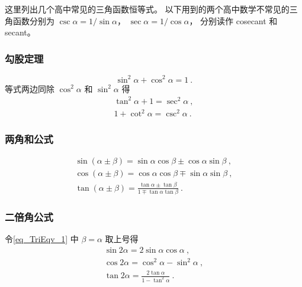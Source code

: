

这里列出几个高中常见的三角函数恒等式。 以下用到的两个高中数学不常见的三角函数分别为 $\csc \alpha= 1/\sin \alpha$， $\sec \alpha = 1/\cos \alpha$， 分别读作 cosecant 和 secant。

\subsubsection{勾股定理}
\begin{equation}
\sin^2 \alpha + \cos^2 \alpha = 1~.
\end{equation}
等式两边同除 $\cos^2 \alpha$ 和 $\sin^2 \alpha$ 得
\begin{gather}
\label{eq_TriEqv_13}
\tan^2 \alpha + 1 = \sec^2 \alpha~,\\
1 + \cot^2\alpha = \csc^2\alpha~.
\end{gather}

\subsubsection{两角和公式}
\begin{gather}
\label{eq_TriEqv_1}
\sin(\alpha\pm \beta) = \sin \alpha\cos \beta \pm \cos \alpha\sin \beta~,\\
\label{eq_TriEqv_2}
\cos(\alpha\pm \beta) = \cos \alpha\cos \beta \mp \sin \alpha\sin \beta~,\\
\tan(\alpha\pm \beta) = \frac{\tan \alpha \pm \tan \beta}{1 \mp \tan \alpha \tan \beta}~.
\end{gather}

\subsubsection{二倍角公式}

令\autoref{eq_TriEqv_1} 中 $\beta=\alpha$ 取上号得
\begin{gather}
\sin 2\alpha = 2\sin \alpha\cos \alpha~,\\
\label{eq_TriEqv_4}
\cos 2\alpha = \cos^2 \alpha - \sin^2 \alpha~,\\
\tan 2\alpha = \frac{2\tan \alpha}{1 - \tan^2 \alpha}~.
\end{gather}

